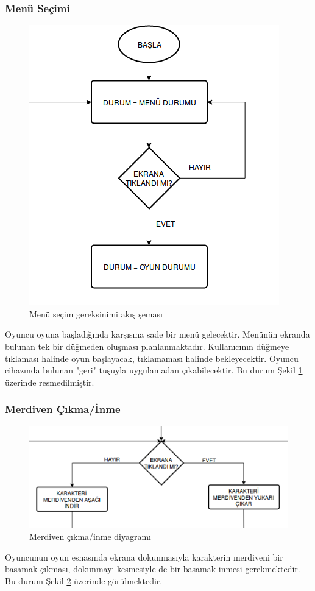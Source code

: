 \documentclass[12pt,a4paper]{article}
\begin{document}
   \subsubsection{Menü Seçimi}
   \begin{figure}
      \begin{center}
         \includegraphics{res/menu.png}
         \caption{Menü seçim gereksinimi akış şeması}
         \label{fig:menu}
      \end{center}
   \end{figure}
   Oyuncu oyuna başladığında karşısına sade bir menü gelecektir. Menünün ekranda bulunan tek bir düğmeden oluşması planlanmaktadır. Kullanıcının düğmeye tıklaması halinde oyun başlayacak, tıklamaması halinde bekleyecektir. Oyuncu cihazında bulunan "geri" tuşuyla uygulamadan çıkabilecektir. Bu durum Şekil \ref{fig:menu} üzerinde resmedilmiştir.

   \subsubsection{Merdiven Çıkma/İnme}
   \begin{figure}[h!]
      \begin{center}
         \includegraphics{res/st.png}
         \caption{Merdiven çıkma/inme diyagramı}
         \label{fig:st}
      \end{center}
   \end{figure}
   Oyuncunun oyun esnasında ekrana dokunmasıyla karakterin merdiveni bir basamak çıkması, dokunmayı kesmesiyle de bir basamak inmesi gerekmektedir. Bu durum Şekil \ref{fig:st} üzerinde görülmektedir.
\end{document}
